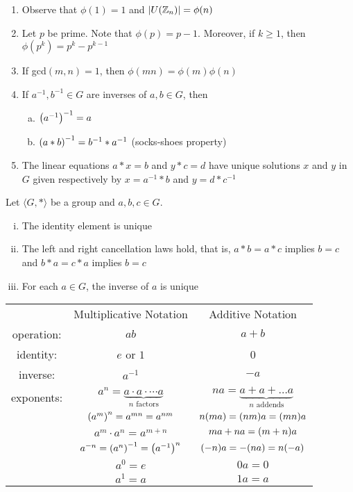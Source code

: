 \begin{remark} \phantom{blank}
    \begin{enumerate}
        \item Observe that $\phi(1) = 1$ and $\qty|U(\mathbb{Z}_n)| = \phi(n)$
        \item Let $p$ be prime. Note that $\phi(p) = p - 1$. Moreover, if $k \geq 1$, then $\phi(p^k) = p^k - p^{k-1}$ 
        \item If gcd$(m,n) = 1$, then $\phi(mn) = \phi(m) \phi(n)$
        \item If $a^{-1}, b^{-1} \in G$ are inverses of $a, b \in G$, then 
        \begin{enumerate}[a.]
            \item $\qty(a^{-1})^{-1} = a$
            \item $\qty(a \ast b)^{-1} = b^{-1} \ast a^{-1}$ (socks-shoes property)
        \end{enumerate}
        \item The linear equations $a \ast x = b$ and $y \ast c = d$ have unique solutions $x$ and $y$ in $G$ given respectively by $x = a^{-1} \ast b$ and $y = d \ast c^{-1}$
    \end{enumerate}
\end{remark}

\begin{theorem}
    Let $\langle G, \ast \rangle$  be a group and $a, b, c \in G$.
    \begin{enumerate}[i.]
        \item The identity element is unique
        \item The left and right cancellation laws hold, that is, $a \ast b = a \ast c$ implies $b = c$ and $b \ast a = c \ast a$ implies $b = c$
        \item For each $a \in G$, the inverse of $a$ is unique
    \end{enumerate}
\end{theorem}

\begin{center}
    \begin{tabular}{c c c}
         & Multiplicative Notation & Additive Notation \\
         operation: & $ab$ & $a+b$ \\
         identity: & $e$ or $1$ & 0 \\
         inverse: & $a^{-1}$ & $-a$ \\
         exponents: & $a^n = \underbrace{a \cdot a \cdot \dotsb a}_{n \text{ factors}}$ & $na = \underbrace{a + a + \dotsc a}_{n \text{ addends}}$ \\
         & $\qty(a^m)^n = a^{mn} = a^{nm}$ & $n\qty(ma) = \qty(nm)a = (mn)a$ \\
         & $a^m \cdot a^n = a^{m+n}$ & $ma + na = \qty(m+n)a$ \\
         & $a^{-n} = \qty(a^n)^{-1} = \qty(a^{-1})^n$ & $\qty(-n)a = - \qty(na) = n \qty(-a)$ \\
         & $a^0 = e$ & $0a = 0$ \\
         & $a^1 = a$ & $1a = a$
    \end{tabular}
\end{center}

